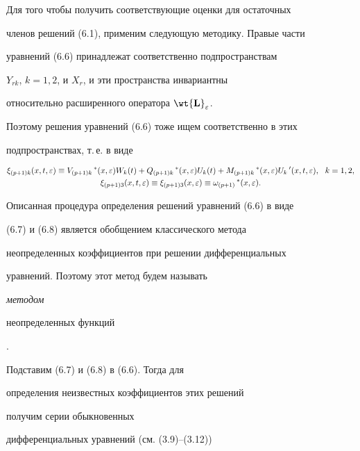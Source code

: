 Для того чтобы получить соответствующие оценки для остаточных


членов решений (6.1), применим следующую методику. Правые части


уравнений (6.6) принадлежат соответственно подпространствам


$Y_{rk}$, $k = 1,2$, и $X_r$, и эти пространства инвариантны


относительно расширенного оператора $\bold{\wt{L}}_{\e}$.


Поэтому решения уравнений (6.6) тоже ищем соответственно в этих


подпространствах, т.\,е. в виде


\begin{gather}


\xi_{(p+1)k} (x,t, \e) \equiv V_{(p+1)k}\,^* (x, \e) W_k


(t) + Q_{(p+1)k}\,^* (x, \e) U_k (t) +M_{(p+1)k}\,^* (x, \e) U_k\,'


(x,t, \e), \ \ k=1,2, \\


%


\xi_{(p+1)3} (x,t, \e) \equiv \xi_{(p+1)3} (x, \e) \equiv


\omega_{(p+1) }\,^* (x, \e).


\end{gather}





Описанная процедура определения решений уравнений (6.6) в виде


(6.7) и (6.8) является обобщением классического метода


неопределенных коэффициентов при решении дифференциальных


уравнений. Поэтому этот метод будем называть {\it методом


неопределенных функций}.


Подставим (6.7) и (6.8) в (6.6). Тогда для


определения неизвестных коэффициентов этих решений


получим серии обыкновенных


дифференциальных уравнений (см. (3.9)--(3.12))


